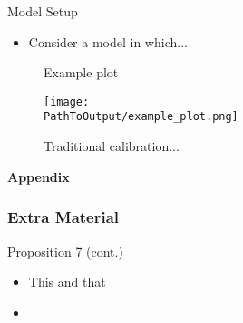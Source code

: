 \begin{frame}{Model Setup}
\begin{itemize}
\item Consider a model in which...
\end{itemize}
\label{slide:state-space-framework}
\hyperlink{slide:stylized_facts}{}
\end{frame}

\begin{frame}

\begin{figure}
\centering
\caption{Example plot}
  \centering
  \texttt{[image: \\PathToOutput/example\_plot.png]}
\caption*{
  Traditional calibration...
  }
\label{fig:div-futures-habits-comparison}
\end{figure}

\end{frame}

\appendix
\begin{frame}
  \centering
  \textbf{Appendix}
\end{frame}

\begin{frame}
  \frametitle{Extra Material}
  \label{slide:prop7}
\alert{Proposition 7 (cont.)}
\begin{itemize}
\item This and that
\item \citet{Alvarez2005}
\end{itemize}
\end{frame}



\begin{frame}
\vspace{15pt}
  
\end{frame}







